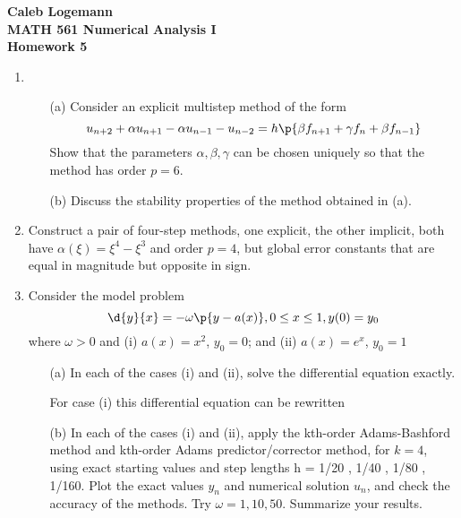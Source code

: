 \documentclass[11pt]{article}
\begin{document}
\noindent \textbf{\Large{Caleb Logemann \\
MATH 561 Numerical Analysis I \\
Homework 5
}}

\begin{enumerate}
    \item %
        \begin{enumerate}
            \item[(a)]
                Consider an explicit multistep method of the form
                \[
                    u_{n+2} + \alpha u_{n+1} - \alpha u_{n-1} - u_{n-2} =
                    h\p{\beta f_{n+1} + \gamma f_n + \beta f_{n-1}}
                \]
                Show that the parameters $\alpha, \beta, \gamma$ can be
                chosen uniquely so that the method has order $p = 6$.


            \item[(b)]
                Discuss the stability properties of the method obtained in (a).

        \end{enumerate}

    \item %
        Construct a pair of four-step methods, one explicit, the other implicit,
        both have $\alpha(\xi) = \xi^4 - \xi^3$ and order $p = 4$,
        but global error constants that are equal in magnitude but opposite in
        sign.


    \item %
        Consider the model problem
        \[
            \d{y}{x} = -\omega\p{y - a(x)}, 0 \le x \le 1, y(0) = y_0
        \]
        where $\omega > 0$ and (i) $a(x) = x^2$, $y_0 = 0$; and (ii) $a(x) = e^x$, $y_0 = 1$
        \begin{enumerate}
            \item[(a)]
                In each of the cases (i) and (ii), solve the differential
                equation exactly.

                For case (i) this differential equation can be rewritten

            \item[(b)]
                In each of the cases (i) and (ii), apply the kth-order Adams-Bashford method and
                kth-order Adams predictor/corrector method, for $k = 4$, using exact starting values and
                step lengths h = 1/20 , 1/40 , 1/80 , 1/160. 
                Plot the exact values $y_n$ and numerical solution $u_n$, and 
                check the accuracy of the methods.
                Try $\omega = 1, 10, 50$.
                Summarize your results.
        \end{enumerate}
\end{enumerate}
\end{document}
